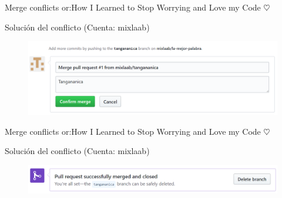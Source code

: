 \documentclass[10pt]{beamer}
\begin{document}
\begin{frame}{Merge conflicts or:}{How I Learned to Stop Worrying and Love my Code $\heartsuit$}

\begin{block}{Solución del conflicto (Cuenta: mixlaab)}

\begin{figure}[h!]
\centering
\includegraphics [scale=0.25]{merge2}
\label{fig:issues}
\end{figure}
    
\end{block}

\end{frame}

\begin{frame}{Merge conflicts or:}{How I Learned to Stop Worrying and Love my Code $\heartsuit$}

\begin{block}{Solución del conflicto (Cuenta: mixlaab)}

\begin{figure}[h!]
\centering
\includegraphics [scale=0.25]{merge3}
\label{fig:issues}
\end{figure}
    
\end{block}

\end{frame}
\end{document}
